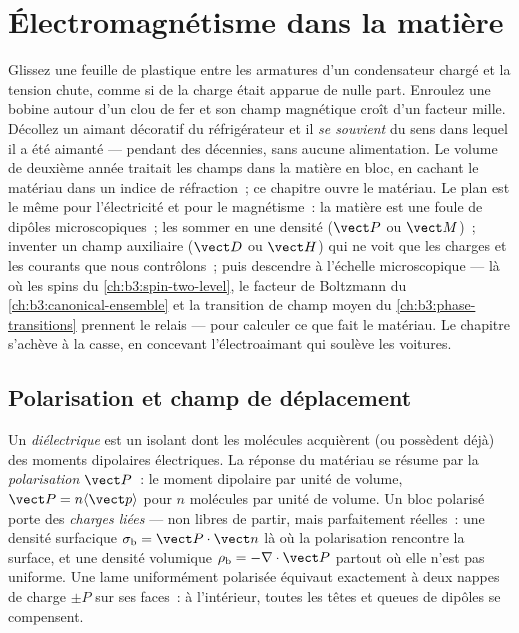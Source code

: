 \chapter{Électromagnétisme dans la matière}\label{ch:b3:electromagnetism-in-matter}


Glissez une feuille de plastique entre les armatures d'un condensateur
chargé et la tension chute, comme si de la charge était apparue de
nulle part. Enroulez une bobine autour d'un clou de fer et son champ
magnétique croît d'un facteur mille. Décollez un aimant décoratif du
réfrigérateur et il \emph{se souvient} du sens dans lequel il a été
aimanté --- pendant des décennies, sans aucune alimentation. Le volume
de deuxième année traitait les champs dans la matière en bloc, en
cachant le matériau dans un indice de réfraction~; ce chapitre ouvre
le matériau. Le plan est le même pour l'électricité et pour le
magnétisme~: la matière est une foule de dipôles microscopiques~;
les sommer en une densité ($\vect P$ ou $\vect M$)~; inventer un champ
auxiliaire ($\vect D$ ou $\vect H$) qui ne voit que les charges et les
courants que nous contrôlons~; puis descendre à l'échelle
microscopique --- là où les spins du \cref{ch:b3:spin-two-level}, le
facteur de Boltzmann du \cref{ch:b3:canonical-ensemble} et la
transition de champ moyen du \cref{ch:b3:phase-transitions} prennent
le relais --- pour calculer ce que fait le matériau. Le chapitre
s'achève à la casse, en concevant l'électroaimant qui soulève les
voitures.

\section{Polarisation et champ de déplacement}

\begin{definition}\label{def:b3:electromagnetism-in-matter:polarisation}
Un \emph{diélectrique} est un isolant dont les molécules acquièrent
(ou possèdent déjà) des moments dipolaires électriques. La réponse du
matériau se résume par la \emph{polarisation} $\vect P$~: le moment
dipolaire par unité de volume, $\vect P = n\langle\vect p\rangle$ pour
$n$ molécules par unité de volume. Un bloc polarisé porte des
\emph{charges liées} --- non libres de partir, mais parfaitement
réelles~: une densité surfacique
$\sigma_{\text{b}} = \vect P\cdot\vect n$ là où la polarisation
rencontre la surface, et une densité volumique $\rho_{\text{b}} =
-\nabla\cdot\vect P$ partout où elle n'est pas uniforme. Une lame
uniformément polarisée équivaut exactement à deux nappes de charge
$\pm P$ sur ses faces~: à l'intérieur, toutes les têtes et queues de
dipôles se compensent.
\end{definition}


